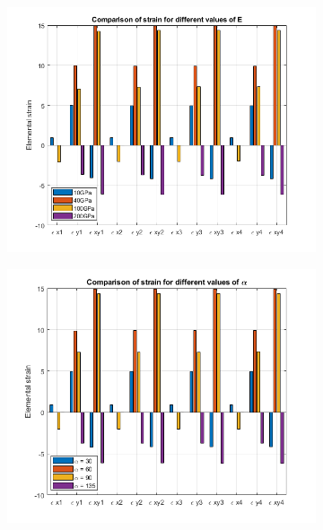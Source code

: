 \documentclass[11pt]{article}
\begin{document}
\begin{figure}[H]
    \centering
    \begin{subfigure}{.5\textwidth}
        \centering
        \includegraphics[width=\linewidth]{img/fig7}
        \caption{}
    \end{subfigure}%
    \begin{subfigure}{.5\textwidth}
        \centering
        \includegraphics[width=\linewidth]{img/fig8}
        \caption{}
    \end{subfigure}
    \caption{}
    \label{fig:case3}
\end{figure}
\end{document}
